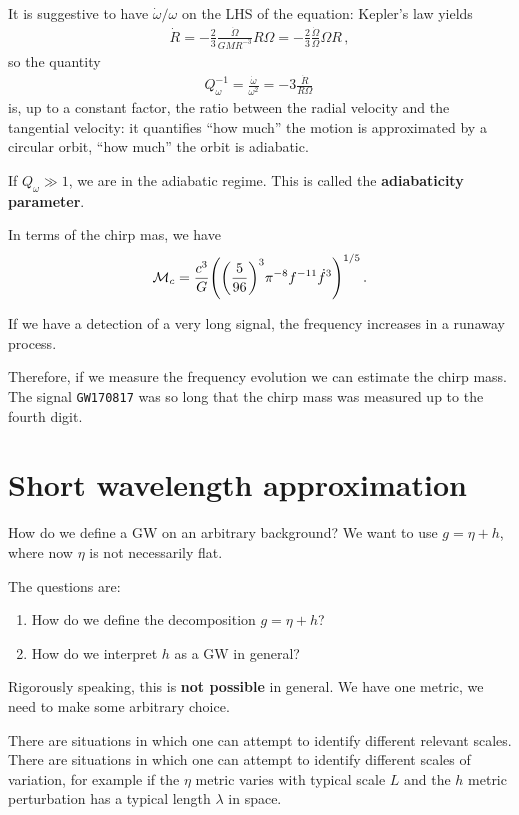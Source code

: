 \documentclass[main.tex]{subfiles}
\begin{document}
It is suggestive to have \(\dot{\omega} / \omega \) on the LHS of the equation: Kepler's law yields 
%
\begin{align}
\dot{R} = - \frac{2}{3} \frac{\dot{\Omega}}{GM R^{-3}} R \Omega = - \frac{2}{3} \frac{\dot{\Omega}}{\Omega } \Omega R
\,,
\end{align}
%
so the quantity 
%
\begin{align}
Q^{-1}_\omega = \frac{\dot{\omega}}{\omega^2} = - 3 \frac{\dot{R}}{R \Omega }
\,
\end{align}
%
is, up to a constant factor, the ratio between the radial velocity and the tangential velocity: it quantifies ``how much'' the motion is approximated by a circular orbit, ``how much'' the orbit is adiabatic. 

If \(Q_\omega \gg 1\), we are in the adiabatic regime. This is called the \textbf{adiabaticity parameter}.

In terms of the chirp mas, we have 
%
\begin{align}
\mathcal{M}_c = \frac{c^3}{G} \qty( \qty( \frac{5}{96})^{3} \pi^{-8} f^{-11} \dot{f}^{3})^{1/5}
\,.
\end{align}

If we have a detection of a very long signal, the frequency increases in a runaway process. 

Therefore, if we measure the frequency evolution we can estimate the chirp mass. The signal \texttt{GW170817} was so long that the chirp mass was measured up to the fourth digit.  

\section{Short wavelength approximation}

How do we define a GW on an arbitrary background? We want to use \(g = \eta + h\), where now \(\eta \) is not necessarily flat.
 
The questions are:
\begin{enumerate}
    \item How do we define the decomposition \(g = \eta + h\)?
    \item How do we interpret \(h\) as a GW in general?
\end{enumerate}

Rigorously speaking, this is \textbf{not possible} in general. We have one metric, we need to make some arbitrary choice.

There are situations in which one can attempt to identify different relevant scales. 
There are situations in which one can attempt to identify different scales of variation, for example if the \(\eta \) metric varies with typical scale \(L\) and the \(h\) metric perturbation has a typical length \(\lambda\) in space. 
\end{document}
